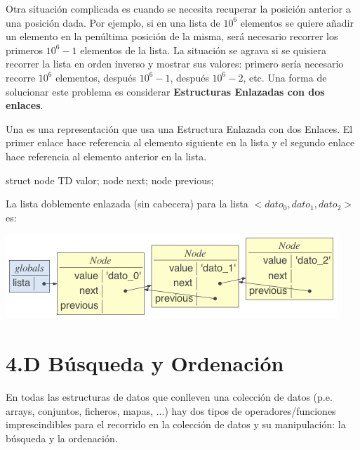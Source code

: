 Otra situación complicada es cuando se necesita recuperar la posición anterior a una posición dada. Por ejemplo, si en una lista de $10^6$ elementos se quiere añadir un elemento en la penúltima posición de la misma, será necesario recorrer los primeros $10^6-1$ elementos de la lista. La situación se agrava si se quisiera recorrer la lista en orden inverso y mostrar sus valores: primero sería necesario recorre $10^6$ elementos, después $10^6-1$, después $10^6-2$, etc. Una forma de solucionar este problema es considerar \textbf{Estructuras Enlazadas con dos enlaces}.

Una  es una representación que usa una Estructura Enlazada con dos Enlaces. El primer enlace hace referencia al elemento siguiente en la lista y el segundo enlace hace referencia al elemento anterior en la lista.

\hfil
\begin{minipage}{.23\textwidth}
\begin{pyverbatim}[][frame=single]
struct node {
   TD valor;
   node next;
   node previous;
}
\end{pyverbatim}
\end{minipage}


\begin{ejemplo}
La lista doblemente enlazada (sin cabecera) para la lista $<dato_0, dato_1, dato_2>$ es:

\centerline{\includegraphics[width=.65\textwidth]{input/05-List-fig/ejemListaDoubleLinked}}
\end{ejemplo}






\section*{4.D Búsqueda y Ordenación}

En todas las estructuras de datos que conlleven una colección de datos (p.e. arrays, conjuntos, ficheros, mapas, ...) hay dos tipos de operadores/funciones imprescindibles para el recorrido en la colección de datos y su manipulación: la búsqueda y la ordenación.

